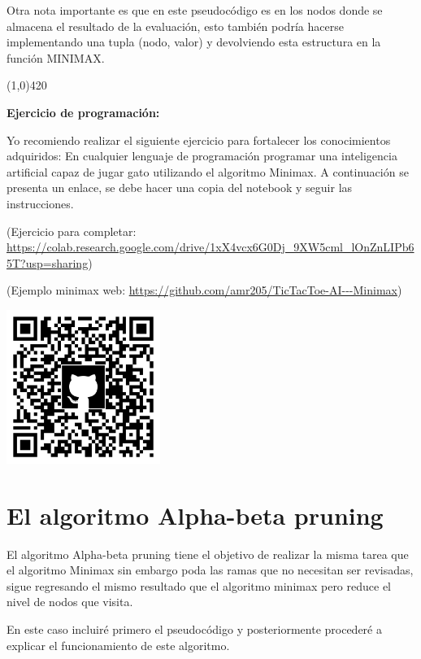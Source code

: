 \documentclass[11pt,fleqn]{book} %
\begin{document}
Otra nota importante es que en este pseudocódigo es en los nodos donde se almacena el resultado de la evaluación, esto también podría hacerse implementando una tupla (nodo, valor) y devolviendo esta estructura en la función MINIMAX.

\begin{center}
\line(1,0){420}
\end{center}

\textbf{Ejercicio de programación:}

Yo recomiendo realizar el siguiente ejercicio para fortalecer los conocimientos adquiridos:
En cualquier lenguaje de programación programar una inteligencia artificial capaz de jugar gato utilizando el algoritmo Minimax. A continuación se presenta un enlace, se debe hacer una copia del notebook y seguir las instrucciones.

(Ejercicio para completar: \url{https://colab.research.google.com/drive/1xX4vcx6G0Dj_9XW5cml_lOnZnLIPb65T?usp=sharing})

(Ejemplo minimax web: \url{https://github.com/amr205/TicTacToe-AI---Minimax})


\includegraphics[width=5cm]{Pictures/github/minimax.png}

\clearpage

\section{El algoritmo Alpha-beta pruning} 

El algoritmo Alpha-beta pruning tiene el objetivo de realizar la misma tarea que el algoritmo Minimax sin embargo poda las ramas que no necesitan ser revisadas, sigue regresando el mismo resultado que el algoritmo minimax pero reduce el nivel de nodos que visita.

En este caso incluiré primero el pseudocódigo y posteriormente procederé a explicar el funcionamiento de este algoritmo.
\end{document}
